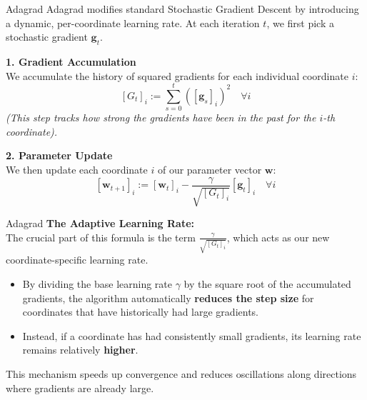 \documentclass[10pt]{beamer}
\begin{document}
\begin{frame}{Adagrad}
    Adagrad modifies standard Stochastic Gradient Descent by introducing a dynamic, per-coordinate learning rate. At each iteration $t$, we first pick a stochastic gradient $\mathbf{g}_t$.

    \vspace{0.3cm}
    \textbf{1. Gradient Accumulation}\\
    We accumulate the history of squared gradients for each individual coordinate $i$:
    $$[G_t]_i := \sum_{s=0}^{t} ([\mathbf{g}_s]_i)^2 \quad \forall i$$
    \textit{(This step tracks how strong the gradients have been in the past for the $i$-th coordinate).}

    \vspace{0.3cm}
    \textbf{2. Parameter Update}\\
    We then update each coordinate $i$ of our parameter vector $\mathbf{w}$:
    $$[\mathbf{w}_{t+1}]_i := [\mathbf{w}_t]_i - \frac{\gamma}{\sqrt{[G_t]_i}} [\mathbf{g}_t]_i \quad \forall i$$
\end{frame}

\begin{frame}{Adagrad}
    \textbf{The Adaptive Learning Rate:}\\
    The crucial part of this formula is the term $\frac{\gamma}{\sqrt{[G_t]_i}}$, which acts as our new coordinate-specific learning rate. 
    
    \vspace{0.3cm}
    \begin{itemize}
        \item By dividing the base learning rate $\gamma$ by the square root of the accumulated gradients, the algorithm automatically \textbf{reduces the step size} for coordinates that have historically had large gradients.
        
        \vspace{0.3cm}
        \item Instead, if a coordinate has had consistently small gradients, its learning rate remains relatively \textbf{higher}. 
    \end{itemize}

    \vspace{0.4cm}
    This mechanism speeds up convergence and reduces oscillations along directions where gradients are already large.
\end{frame}
\end{document}
